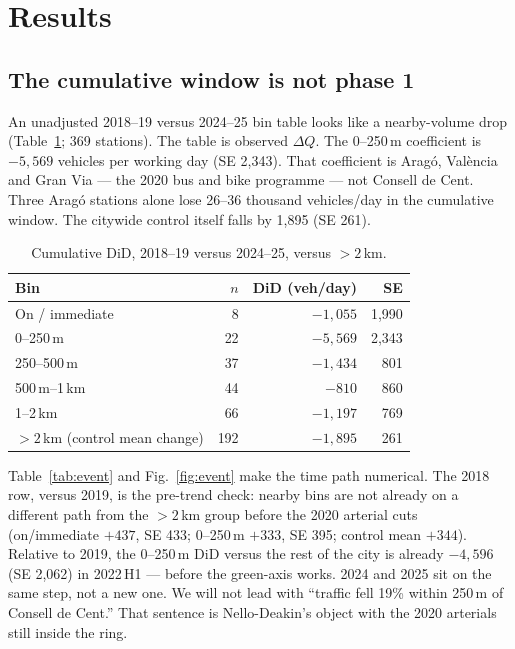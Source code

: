 \documentclass[a4paper,fleqn]{cas-dc}
\newcommand{\DQ}{\Delta Q}
\begin{document}
\section{Results}
\label{sec:results}

\subsection{The cumulative window is not phase 1}

An unadjusted 2018--19 versus 2024--25 bin table looks like a nearby-volume drop
(Table~\ref{tab:cum}; 369 stations). The table is observed $\DQ$. The
0--250\,m coefficient is $-5{,}569$ vehicles per working day (SE 2{,}343).
That coefficient is Arag\'o, Val\`encia and Gran Via --- the 2020 bus and bike
programme --- not Consell de Cent. Three Arag\'o stations alone lose 26--36
thousand vehicles/day in the cumulative window. The citywide control itself
falls by 1{,}895 (SE 261).

\begin{table}
\caption{Cumulative DiD, 2018--19 versus 2024--25, versus $>2$\,km.}
\label{tab:cum}
\centering
\small
\begin{tabular}{@{}lrrr@{}}
\toprule
Bin & $n$ & DiD (veh/day) & SE \\
\midrule
On / immediate & 8 & $-1{,}055$ & 1{,}990 \\
0--250\,m & 22 & $-5{,}569$ & 2{,}343 \\
250--500\,m & 37 & $-1{,}434$ & 801 \\
500\,m--1\,km & 44 & $-810$ & 860 \\
1--2\,km & 66 & $-1{,}197$ & 769 \\
$>2$\,km (control mean change) & 192 & $-1{,}895$ & 261 \\
\bottomrule
\end{tabular}
\end{table}

Table~\ref{tab:event} and Fig.~\ref{fig:event} make the time path numerical.
The 2018 row, versus 2019, is the pre-trend check: nearby bins are not
already on a different path from the $>2$\,km group before the 2020 arterial
cuts (on/immediate $+437$, SE 433; 0--250\,m $+333$, SE 395; control mean
$+344$). Relative to 2019, the 0--250\,m DiD versus the rest of the city is already
$-4{,}596$ (SE 2{,}062) in 2022\,H1 --- before the green-axis works. 2024 and
2025 sit on the same step, not a new one. We will not lead with ``traffic fell
19\% within 250\,m of Consell de Cent.'' That sentence is Nello-Deakin's
object with the 2020 arterials still inside the ring.
\end{document}
